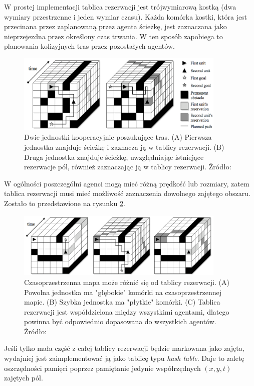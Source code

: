 W prostej implementacji tablica rezerwacji jest trójwymiarową kostką (dwa wymiary przestrzenne i jeden wymiar czasu).
Każda komórka kostki, która jest przecinana przez zaplanowaną przez agenta ścieżkę, jest zaznaczana jako nieprzejezdna przez określony czas trwania. W ten sposób zapobiega to planowania kolizyjnych tras przez pozostałych agentów.

\begin{figure}[H]
	\centering
	\includegraphics[width=10cm]{img/reservation-table}
	\caption{Dwie jednostki kooperacyjnie poszukujące tras. (A) Pierwsza jednostka znajduje ścieżkę i zaznacza ją w tablicy rezerwacji. (B) Druga jednostka znajduje ścieżkę, uwzględniając istniejące rezerwacje pól, również zaznaczając ją w tablicy rezerwacji. Źródło: \cite{cooppath}}
	\label{fig:img_reservation-table}
\end{figure}

W ogólności poszczególni agenci mogą mieć różną prędkość lub rozmiary, zatem tablica rezerwacji musi mieć możliwość zaznaczenia dowolnego zajętego obszaru. Zostało to przedstawione na rysunku \ref{fig:img_reservation-table-2}.

\begin{figure}[H]
	\centering
	\includegraphics[width=10cm]{img/reservation-table-2}
	\caption{Czasoprzestrzenna mapa może różnić się od tablicy rezerwacji. (A) Powolna jednostka ma "głębokie" komórki na czasoprzestrzennej mapie. (B) Szybka jednostka ma "płytkie" komórki. (C) Tablica rezerwacji jest współdzielona między wszystkimi agentami, dlatego powinna być odpowiednio dopasowana do wszystkich agentów. Źródło: \cite{cooppath}}
	\label{fig:img_reservation-table-2}
\end{figure}

Jeśli tylko mała część z całej tablicy rezerwacji będzie markowana jako zajęta, wydajniej jest zaimplementować ją jako tablicę typu {\it hash table}. Daje to zaletę oszczędności pamięci poprzez pamiętanie jedynie współrzędnych $(x, y, t)$ zajętych pól.

